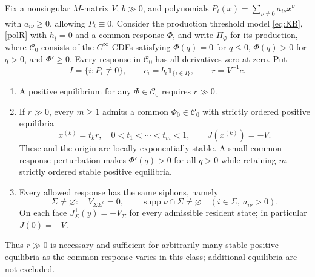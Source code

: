 Fix a nonsingular $M$-matrix $V$, $b\gg0$, and polynomials
$P_i(x)=\sum_{\nu\ne0}a_{i\nu}x^\nu$ with $a_{i\nu}\ge0$,
allowing $P_i\equiv0$. Consider the production threshold model \eqref{eq:KB}, \eqref{polR}
with $h_i=0$ and a common response $\Phi$, and write $\Pi_\Phi$ for its production,
where $\mathcal C_0$ consists of the $C^\infty$ CDFs satisfying
$\Phi(q)=0$ for $q\le0$, $\Phi(q)>0$ for $q>0$, and $\Phi'\ge0$.
Every response in $\mathcal C_0$ has all derivatives zero at zero. Put
\[
 I=\{i:P_i\not\equiv0\},\qquad
 c_i=b_i\mathbf1_{\{i\in I\}},\qquad r=V^{-1}c.
\]
\begin{enumerate}
\item A positive equilibrium for any $\Phi\in\mathcal C_0$ requires $r\gg0$.
\item If $r\gg0$, every $m\ge1$ admits a common $\Phi_0\in\mathcal C_0$
 with strictly ordered positive equilibria
 \[
 x^{(k)}=t_kr,\quad 0<t_1<\cdots<t_m<1,\qquad J(x^{(k)})=-V.
 \]
 These and the origin are locally exponentially stable. A small
 common-response perturbation makes $\Phi'(q)>0$ for all $q>0$ while
 retaining $m$ strictly ordered stable positive equilibria.
\item Every allowed response has the same siphons, namely
 \[
 \Sigma\ne\varnothing:\quad V_{\Sigma\Sigma^c}=0,
 \qquad \operatorname{supp}\nu\cap\Sigma\ne\varnothing
 \quad(i\in\Sigma,\ a_{i\nu}>0).
 \]
 On each face $J_\Sigma^\perp(y)=-V_\Sigma$ for every
 admissible resident state; in particular $J(0)=-V$.
\end{enumerate}
Thus $r\gg0$ is necessary and sufficient for arbitrarily many stable positive equilibria as the common response varies
in this class; additional equilibria are not excluded.
\eeT
